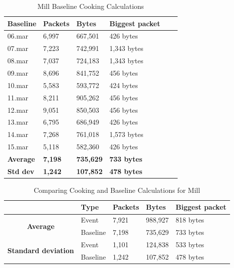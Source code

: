 \begin{table}[H]
    \centering
    \caption{Mill Baseline Cooking Calculations}
    \begin{tabular}{|l|l|l|l|l|l|}
    \hline
        \textbf{Baseline} & \textbf{Packets} & \textbf{Bytes} & \textbf{Biggest packet} \\ \hline
        06.mar & 6,997 & 667,501 & 426 bytes \\ \hline
        07.mar & 7,223 & 742,991 & 1,343 bytes \\ \hline
        08.mar & 7,037 & 724,183 & 1,343 bytes \\ \hline
        09.mar & 8,696 & 841,752 & 456 bytes \\ \hline
        10.mar & 5,583 & 593,772 & 424 bytes \\ \hline
        11.mar & 8,211 & 905,262 & 456 bytes \\ \hline
        12.mar & 9,051 & 850,503 & 456 bytes \\ \hline
        13.mar & 6,795 & 686,949 & 426 bytes \\ \hline
        14.mar & 7,268 & 761,018 & 1,573 bytes \\ \hline
        15.mar & 5,118 & 582,360 & 426 bytes \\ \hline
        \textbf{Average} &  \textbf{7,198}  &  \textbf{735,629}  &  \textbf{733 bytes} \\ \hline
        \textbf{Std dev}  &  \textbf{1,242}   &  \textbf{107,852}   &  \textbf{478 bytes} \\ \hline
    \end{tabular}
    \label{tab:MillBaselineCookingCalculations}
\end{table}

\begin{table}[H]
    \centering
    \caption{Comparing Cooking and Baseline Calculations for Mill}
    \begin{tabular}{c|l|l|l|l|}
        \cline{2-5}
        \multicolumn{1}{l|}{}                                              & \textbf{Type} & \textbf{Packets} & \textbf{Bytes} & \textbf{Biggest packet} \\ \hline
        \multicolumn{1}{|c|}{\multirow{2}{*}{\textbf{Average}}}            & Event         & 7,921              & 988,927        & 818 bytes               \\ \cline{2-5} 
        \multicolumn{1}{|c|}{}                                             & Baseline      & 7,198              & 735,629         & 733 bytes                \\ \hline
        \multicolumn{1}{|c|}{\multirow{2}{*}{\textbf{Standard deviation}}} & Event         & 1,101              & 124,838         & 533 bytes                 \\ \cline{2-5} 
        \multicolumn{1}{|c|}{}                                             & Baseline      & 1,242               & 107,852        &  478 bytes               \\ \hline          
    \end{tabular}
    \label{tab:MillComparingBaselineAndCookingCalculations}
\end{table}

